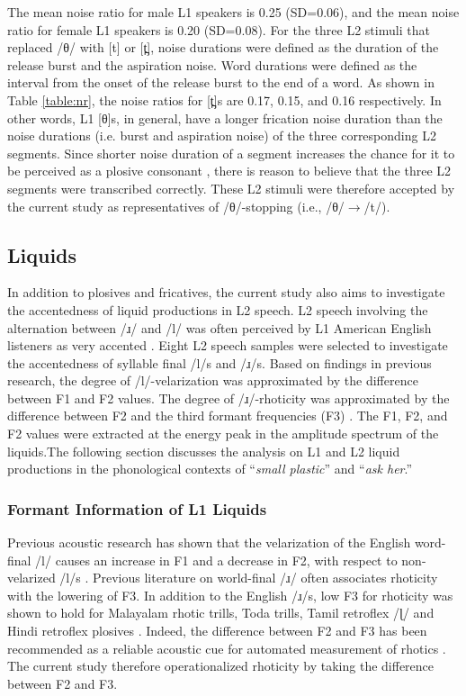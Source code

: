 The mean noise ratio for male L1 speakers is 0.25 (SD=0.06), and the mean noise ratio for female L1 speakers is 0.20 (SD=0.08). For the three L2 stimuli that replaced /θ/ with [t] or [t̪], noise durations were defined as the duration of the release burst and the aspiration noise. Word durations were defined as the interval from the onset of the release burst to the end of a word. As shown in Table \ref{table:nr}, the noise ratios for [t̪]s are 0.17, 0.15, and 0.16 respectively. In other words, L1 [θ]s, in general, have a longer frication noise duration than the noise durations (i.e. burst and aspiration noise) of the three corresponding L2 segments. Since shorter noise duration of a segment increases the chance for it to be perceived as a plosive consonant \citep{Jongman_1989}, there is reason to believe that the three L2 segments were transcribed correctly. These L2 stimuli were therefore accepted by the current study as representatives of /θ/-stopping (i.e., /θ/$\rightarrow$/t/). 

\subsection{Liquids}

In addition to plosives and fricatives, the current study also aims to investigate the accentedness of liquid productions in L2 speech. L2 speech involving the alternation between /ɹ/ and /l/ was often perceived by L1 American English listeners as very accented \citep{Riney_2005}. Eight L2 speech samples were selected to investigate the accentedness of syllable final /l/s and /ɹ/s. Based on findings in previous research, the degree of /l/-velarization was approximated by the difference between F1 and F2 \citep{Riney_2005} values. The degree of /ɹ/-rhoticity was approximated by the difference between F2 and the third formant frequencies (F3) \citep{Ohala_2001}. The F1, F2, and F2 values were extracted at the energy peak in the amplitude spectrum of the liquids.The following section discusses the analysis on L1 and L2 liquid productions in the phonological contexts of “\textit{small plastic}” and “\textit{ask her}.”

\subsubsection{Formant Information of L1 Liquids}

Previous acoustic research has shown that the velarization of the English word-final /l/ causes an increase in F1 and a decrease in F2, with respect to non-velarized /l/s \citep{Riney_2005}. Previous literature on world-final /ɹ/ often associates rhoticity with the lowering of F3. In addition to the English  /ɹ/s, low F3 for rhoticity was shown to hold for Malayalam rhotic trills, Toda trills, Tamil retroflex /ɭ/ and Hindi retroflex plosives \citep{Ohala_2001}. Indeed, the difference between F2 and F3 has been recommended as a reliable acoustic cue for automated measurement of rhotics \citep{Campbell_2018}. The current study therefore operationalized rhoticity by taking the difference between F2 and F3. 

